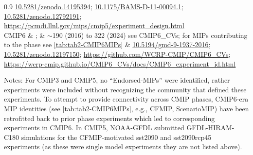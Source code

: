 \documentclass[manuscript]{copernicus}
\def\cred#1{{\color{red}#1}}
\begin{document}
\begin{table}[htp]
{\begin{tabularx}{0.9\textwidth}
            \href{https://doi.org/10.5281/zenodo.14195394}{10.5281/zenodo.14195394}; \href{https://doi.org/10.1175/BAMS-D-11-00094.1}{10.1175/BAMS-D-11-00094.1}; \href{https://doi.org/10.5281/zenodo.12792191}{10.5281/zenodo.12792191};            
            \url{https://pcmdi.llnl.gov/mips/cmip5/experiment\_design.html}\\ \hline			
			CMIP6 & \citet{eyring_overview_2016}; \citet{durack_cmip6_2024} & $\sim$190 (2016) to 322 (2024) see CMIP6\_CVs; for MIPs contributing to the phase see \autoref{tab:tab2-CMIP6MIPs} & 
            \href{https://doi.org/10.5194/gmd-9-1937-2016}{10.5194/gmd-9-1937-2016};
            \href{http://doi.org/10.5281/zenodo.12197150}{10.5281/zenodo.12197150}; \url{https://github.com/WCRP-CMIP/CMIP6\_CVs}; \url{https://wcrp-cmip.github.io/CMIP6\_CVs/docs/CMIP6\_experiment\_id.html}\\
			\hline		
		\end{tabularx}
	} %
	\label{tab:tabAppA1-MIPExperiments}
	\footnotesize{Notes: For CMIP3 and CMIP5, no ``Endorsed-MIPs'' were identified, rather experiments were included without recognizing the community that defined these experiments. To attempt to provide connectivity across CMIP phases, CMIP6-era MIP identities (see \autoref{tab:tab2-CMIP6MIPs}, e.g., CFMIP, ScenarioMIP) have been retrofitted back to prior phase experiments which led to corresponding experiments in CMIP6. In CMIP5, NOAA-GFDL submitted GFDL-HIRAM-C180 simulations for the CFMIP-motivated sst2090 and sst2090rcp45 experiments (as these were single model experiments they are not listed above).}
\end{table}
\end{document}
